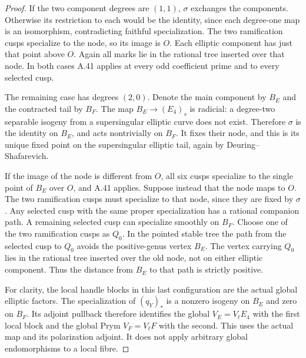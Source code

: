 \begin{proof}
If the two component degrees are \((1,1)\), \(\sigma\)
exchanges the components. Otherwise its restriction to each
would be the identity, since each degree-one map is an
isomorphism, contradicting faithful specialization. The
two ramification cusps specialize to the node, so its image
is \(O\). Each elliptic component has just that point
above \(O\). Again all marks lie in the rational tree
inserted over that node. In both cases A.41 applies at every
odd coefficient prime and to every selected cusp.

The remaining case has degrees \((2,0)\). Denote the main
component by \(B_E\) and the contracted tail by \(B_F\).
The map \(B_E\to(E_4)_s\) is radicial: a degree-two
separable isogeny from a supersingular elliptic curve does
not exist. Therefore \(\sigma\) is the identity on
\(B_E\), and acts nontrivially on \(B_F\). It fixes
their node, and this is its unique fixed point on the
supersingular elliptic tail, again by Deuring--Shafarevich.

If the image of the node is different from \(O\), all six
cusps specialize to the single point of \(B_E\) over
\(O\), and A.41 applies. Suppose instead that the node
maps to \(O\). The two ramification cusps must specialize
to that node, since they are fixed by \(\sigma\). Any
selected cusp with the same proper specialization has a
rational companion path. A remaining selected cusp can
specialize smoothly on \(B_F\). Choose one of the two
ramification cusps as \(Q_0\). In the pointed stable
tree the path from the selected cusp to \(Q_0\) avoids
the positive-genus vertex \(B_E\). The vertex carrying
\(Q_0\) lies in the rational tree inserted over the old
node, not on either elliptic component. Thus the distance
from \(B_E\) to that path is strictly positive.

For clarity, the local handle blocks in this last configuration
are the actual global elliptic factors. The specialization of
\((q_Y)_*\) is a nonzero isogeny on \(B_E\) and zero on
\(B_F\). Its adjoint pullback therefore identifies the
global \(V_E=V_\ell E_4\) with the first local block and
the global Prym \(V_F=V_\ell F\) with the second. This
uses the actual map and its polarization adjoint. It does
not apply arbitrary global endomorphisms to a local fibre.


\end{proof}

